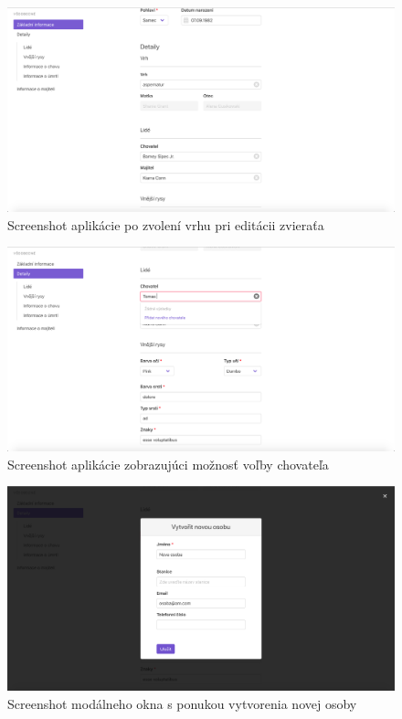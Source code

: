 \begin{figure}[H]
	\includegraphics[width=1.0\textwidth]{media/priloha/zviera/editacia/3.png}
	\caption{Screenshot aplikácie po zvolení vrhu pri editácii zvieraťa}
\end{figure}

\begin{figure}[H]
	\includegraphics[width=1.0\textwidth]{media/priloha/zviera/editacia/4.png}
	\caption{Screenshot aplikácie zobrazujúci možnosť voľby chovateľa}
\end{figure}

\begin{figure}[H]
	\includegraphics[width=1.0\textwidth]{media/priloha/zviera/editacia/5.png}
	\caption{Screenshot modálneho okna s ponukou vytvorenia novej osoby}
\end{figure}

